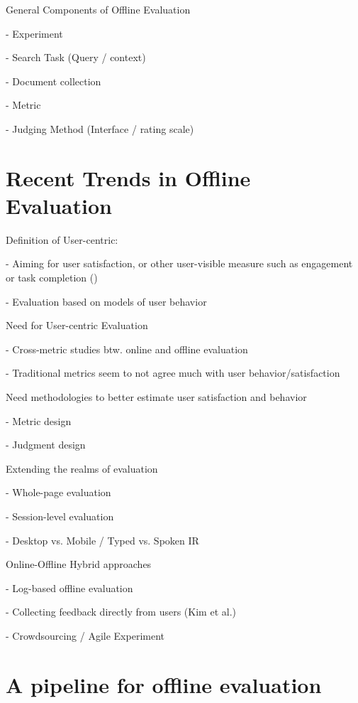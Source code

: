 \documentclass[openany]{now} %
\newcommand{\newpar}{\bigskip\noindent}
\begin{document}
\newpar
General Components of Offline Evaluation

-	Experiment

-	Search Task (Query / context)

- 	Document collection 

-	Metric

-	Judging Method (Interface / rating scale) 


\section{Recent Trends in Offline Evaluation}


Definition of User-centric:

- Aiming for user satisfaction, or other user-visible measure such as engagement or task completion (\cite{scholer13})

- Evaluation based on models of user behavior

\newpar
Need for User-centric Evaluation

- Cross-metric studies btw. online and offline evaluation \cite{radl:comp10}

- Traditional metrics seem to not agree much with user behavior/satisfaction
 \cite{Al-Maskari2007} 

\newpar
Need methodologies to better estimate user satisfaction and behavior

-	Metric design
\cite{YilmazSCR10, CarteretteKY11, ChapelleMZG09}

-	Judgment design
\cite{VermaY16, VermaYC16}

\newpar
Extending the realms of evaluation

-	Whole-page evaluation

-	Session-level evaluation

\cite{KanoulasCCS11, CarteretteKHC14}

-	Desktop vs. Mobile / Typed vs. Spoken IR

\cite{VermaYC16}

\newpar
Online-Offline Hybrid approaches

- Log-based offline evaluation \cite{Li:2015} \cite{li2010contextual}

- Collecting feedback directly from users (Kim et al.)

- Crowdsourcing / Agile Experiment

\section{A pipeline for offline evaluation}
\end{document}
